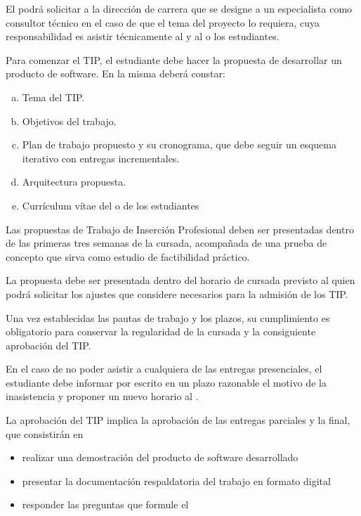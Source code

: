 \articulo El \profesorTIP{} podrá solicitar a la dirección de carrera que
se designe a un especialista como consultor técnico en el caso de que el tema
del proyecto lo requiera, cuya responsabilidad es asistir técnicamente al
\profesorTIP y al o los estudiantes.



\articulo Para comenzar el TIP, el estudiante debe hacer la propuesta de desarrollar un producto de
software. En la misma deberá constar:

\begin{enumerate}[a.]
\item Tema del TIP.
\item Objetivos del trabajo.
\item Plan de trabajo propuesto y su cronograma, que debe seguir un esquema iterativo con entregas
incrementales.
\item Arquitectura propuesta.
\item Currículum vítae del o de los estudiantes
\end{enumerate}

\articulo Las propuestas de Trabajo de Inserción Profesional deben ser presentadas
dentro de las primeras tres semanas de la cursada, acompañada de una prueba de concepto
que sirva como estudio de factibilidad práctico.

\articulo La propuesta debe ser presentada dentro del horario de cursada previsto al \profesorTIP{}
quien podrá solicitar los ajustes que considere necesarios para la admisión de los TIP. 


\articulo Una vez establecidas las pautas de trabajo y los plazos, 
su cumplimiento es obligatorio para conservar la regularidad de la cursada y la
consiguiente aprobación del TIP.

\articulo En el caso de no poder asistir a cualquiera de las entregas presenciales, el estudiante 
debe informar por escrito en un plazo razonable el motivo de la inasistencia y proponer un nuevo 
horario al \profesorTIP{}.


\articulo La aprobación del TIP implica la aprobación de las entregas parciales
y la final, que consistirán en 
\begin{itemize}
 \item realizar una demostración del producto de software desarrollado
 \item presentar la documentación respaldatoria del trabajo en formato digital
 \item responder las preguntas que formule el \profesorTIP{}
\end{itemize}

